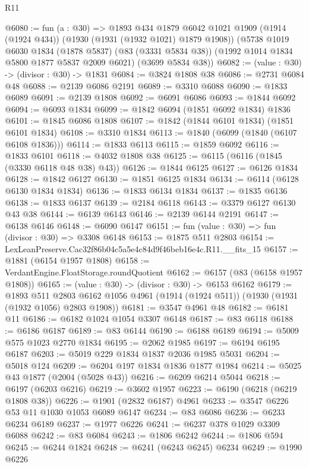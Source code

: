 \begin{lexlean}{R11}
\begin{coremodule}
@6080 := fun (a : @30) =>
  @1893
    @434
    @1879
    @6042
    @1021
    @1909
    (@1914 (@1924 @434))
    (@1930 (@1931 (@1932 @1021) @1879 @1908))
    (@5738
      @1019
      @6030
      @1834
      (@1878 @5837)
      (@83 (@3331 @5834 @38))
      (@1992 @1014 @1834 @5800 @1877 @5837 @2009 @6021)
      (@3699 @5834 @38))
@6082 := (value : @30) -> (divisor : @30) -> @1831
@6084 := @3824 @1808 @38
@6086 := @2731 @6084 @48
@6088 := @2139 @6086 @2191
@6089 := @3310 @6088
@6090 := @1833 @6089
@6091 := @2139 @1808
@6092 := @6091 @6086
@6093 := @1844 @6092
@6094 := @6093 @1834
@6099 := @1842 @6094 (@1851 @6092 @1834) @1836
@6101 := @1845 @6086 @1808
@6107 := @1842 (@1844 @6101 @1834) (@1851 @6101 @1834)
@6108 := @3310 @1834
@6113 := @1840 (@6099 (@1840 (@6107 @6108 @1836)))
@6114 := @1833 @6113
@6115 := @1859 @6092
@6116 := @1833 @6101
@6118 := @4032 @1808 @38
@6125 := @6115 (@6116 (@1845 (@3330 @6118 @48 @38) @43))
@6126 := @1844 @6125
@6127 := @6126 @1834
@6128 := @1842 @6127
@6130 := @1851 @6125 @1834
@6134 := @6114 (@6128 @6130 @1834 @1834)
@6136 := @1833 @6134 @1834
@6137 := @1835 @6136
@6138 := @1833 @6137
@6139 := @2184 @6118
@6143 := @3379 @6127 @6130 @43 @38
@6144 := @6139 @6143
@6146 := @2139 @6144 @2191
@6147 := @6138 @6146
@6148 := @6090 @6147
@6151 := fun (value : @30) => fun (divisor : @30) => @3308 @6148
@6153 := @1875 @511 @2803
@6154 := LexLeanPreserve.Cac32f86b04c5a5e4c84d9f46beb16e4c.R11.__fits_15
@6157 := @1881 (@6154 @1957 @1808)
@6158 := VerdantEngine.FloatStorage.roundQuotient
@6162 := @6157 (@83 (@6158 @1957 @1808))
@6165 := (value : @30) -> (divisor : @30) -> @6153 @6162
@6179 := @1893
    @511
    @2803
    @6162
    @1056
    @4961
    (@1914 (@1924 @511))
    (@1930 (@1931 (@1932 @1056) @2803 @1908))
@6181 := @3547 @4961 @48
@6182 := @6181 @11
@6186 := @6182 @1024 @1054 @3307 @6148
@6187 := @83 @6118
@6188 := @6186 @6187
@6189 := @83 @6144
@6190 := @6188 @6189
@6194 := @5009 @575 @1023 @2770 @1834
@6195 := @2062 @1985
@6197 := @6194 @6195 @6187
@6203 := @5019 @229 @1834 @1837 @2036 @1985 @5031
@6204 := @5018 @124
@6209 := @6204 @197 @1834 @1836 @1877 @1984
@6214 := @5025 @43 @1877 (@2004 (@5028 @43))
@6216 := @6209 @6214 @5044
@6218 := @6197 (@6203 @6216)
@6219 := @3602 @1957
@6223 := @6190 (@6218 (@6219 @1808 @38))
@6226 := @1901 (@2832 @6187) @4961
@6233 := @3547 @6226 @53 @11 @1030 @1053 @6089 @6147
@6234 := @83 @6086
@6236 := @6233 @6234 @6189
@6237 := @1977 @6226
@6241 := @6237 @378 @1029 @3309 @6088
@6242 := @83 @6084
@6243 := @1806 @6242
@6244 := @1806 @594
@6245 := @6244 @1824
@6248 := @6241 (@6243 @6245) @6234
@6249 := @1990 @6226

\end{coremodule}
\end{lexlean}
